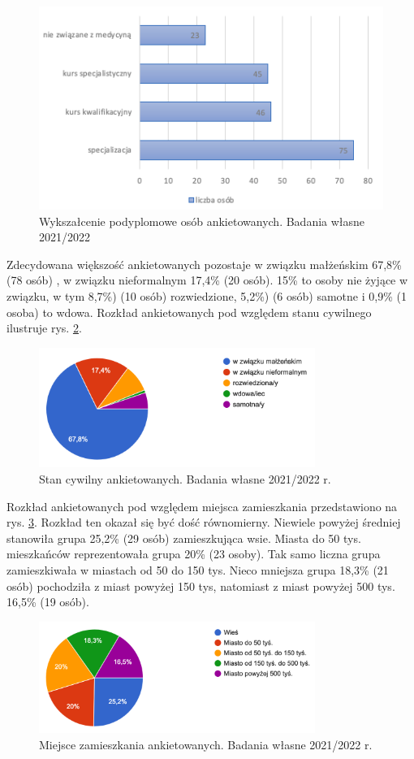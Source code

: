 \documentclass[a4paper,12pt,twoside,openright]{mwrep}
\begin{document}
\begin{figure}[H]
\centering
\includegraphics[width=13cm]{char_gr_bad/podyplom01}
\caption{Wykszałcenie podyplomowe osób ankietowanych. Badania własne 2021/2022}
\label{rys:podyplom}
\end{figure}


Zdecydowana większość ankietowanych pozostaje  w związku małżeńskim 67,8\%  (78 osób) , w związku nieformalnym 17,4\% (20 osób). 15\% to osoby nie żyjące w związku, w tym  8,7\%) (10 osób) rozwiedzione,  5,2\%) (6 osób) samotne i 0,9\%  (1 osoba)  to wdowa. Rozkład ankietowanych pod względem stanu cywilnego ilustruje rys. \ref{rys:cywil}.

\begin{figure}[H]
\centering
\includegraphics[width=9cm]{char_gr_bad/cyw00}
\caption{Stan cywilny ankietowanych. Badania własne 2021/2022 r.}
\label{rys:cywil}
\end{figure}


Rozkład ankietowanych pod względem miejsca zamieszkania przedstawiono na rys. \ref{rys:zamiesz}. Rozkład ten okazał się być dość równomierny. Niewiele powyżej średniej stanowiła grupa 25,2\% (29 osób) zamieszkująca  wsie. Miasta do 50 tys. mieszkańców reprezentowała grupa  20\%  (23 osoby). Tak samo liczna grupa zamieszkiwała w miastach od 50 do 150 tys. Nieco mniejsza grupa  18,3\% (21 osób) pochodziła z miast powyżej 150 tys, natomiast z miast powyżej 500 tys.  16,5\% (19 osób).
\begin{figure}[H]
\centering
\includegraphics[width=9cm]{char_gr_bad/zamieszka00}
\caption{Miejsce zamieszkania ankietowanych. Badania własne 2021/2022 r.}
\label{rys:zamiesz}
\end{figure}
\end{document}
